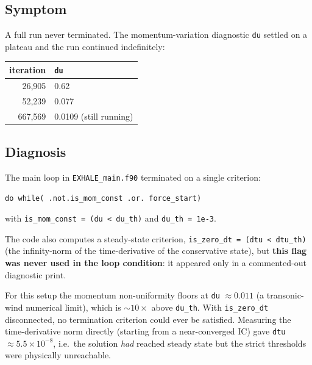 \documentclass[english,a4paper]{my_memo}
\begin{document}
\subsection{Symptom}
A full run never terminated. The momentum-variation diagnostic \texttt{du} settled
on a plateau and the run continued indefinitely:
\begin{center}
\begin{tabular}{rl}
\toprule
iteration & \texttt{du} \\
\midrule
26{,}905  & 0.62 \\
52{,}239  & 0.077 \\
667{,}569 & 0.0109 (still running) \\
\bottomrule
\end{tabular}
\end{center}

\subsection{Diagnosis}
The main loop in \texttt{EXHALE\_main.f90} terminated on a single criterion:
\begin{lstlisting}
do while( .not.is_mom_const .or. force_start)
\end{lstlisting}
with \verb|is_mom_const = (du < du_th)| and \verb|du_th = 1e-3|.

The code also computes a steady-state criterion,
\verb|is_zero_dt = (dtu < dtu_th)| (the infinity-norm of the time-derivative of the
conservative state), but \textbf{this flag was never used in the loop condition}:
it appeared only in a commented-out diagnostic print.

For this setup the momentum non-uniformity floors at \verb|du| $\approx 0.011$ (a
transonic-wind numerical limit), which is $\sim 10\times$ above \verb|du_th|. With
\verb|is_zero_dt| disconnected, no termination criterion could ever be satisfied.
Measuring the time-derivative norm directly (starting from a near-converged IC)
gave \verb|dtu| $\approx 5.5 \times 10^{-8}$, i.e.\ the solution \emph{had} reached
steady state but the strict thresholds were physically unreachable.
\end{document}
